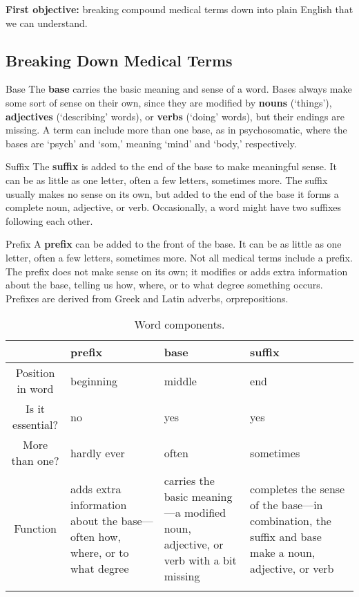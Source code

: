 \begin{rmk}
    \textbf{First objective:} breaking compound medical terms down into plain English that we can understand.
\end{rmk}


\subsection{Breaking Down Medical Terms}

\begin{defn}{Base}
    The \textbf{base} carries the basic meaning and sense of a word. Bases always make some sort of sense on their own, since they are modified by \textbf{nouns} (`things'), \textbf{adjectives} (`describing' words), or \textbf{verbs} (`doing' words), but their endings are missing. A term can include more than one base, as in psychosomatic, where the bases are `psych' and `som,' meaning `mind' and `body,' respectively.
\end{defn}


\begin{defn}{Suffix}
    The \textbf{suffix} is added to the end of the base to make meaningful sense. It can be as little as one letter, often a few letters, sometimes more. The suffix usually makes no sense on its own, but added to the end of the base it forms a complete noun, adjective, or verb. Occasionally, a word might have two suffixes following each other.
\end{defn}


\begin{defn}{Prefix}
    A \textbf{prefix} can be added to the front of the base. It can be as little as one letter, often a few letters, sometimes more. Not all medical terms include a prefix. The prefix does not make sense on its own; it modifies or adds extra information about the base, telling us how, where, or to what degree something occurs. Prefixes are derived from Greek and Latin adverbs, orprepositions.
\end{defn}

\begin{longtable}{ c p{} p{} p{}}
    \caption{Word components.}
    \hline
        & prefix & base & suffix \\ \hline
        Position in word & beginning & middle & end \\ \hline
        Is it essential? & no & yes & yes \\ \hline 
        More than one? & hardly ever & often & sometimes \\ \hline
        Function & adds extra information about the base---often how, where, or to what degree & carries the basic meaning---a modified noun, adjective, or verb with a bit missing & completes the sense of the base---in combination, the suffix and base make a noun, adjective, or verb \\ \hline
    \label{tab:parts}
\end{longtable}


